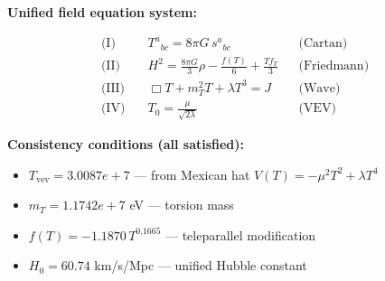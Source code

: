 
\textbf{Unified field equation system:}

\begin{align}
  \text{(I)} \quad & T^a{}_{bc} = 8\pi G \, s^a{}_{bc} && \text{(Cartan)} \\
  \text{(II)} \quad & H^2 = \frac{8\pi G}{3}\rho - \frac{f(T)}{6} + \frac{Tf_T}{3} && \text{(Friedmann)} \\
  \text{(III)} \quad & \Box T + m_T^2 T + \lambda T^3 = J && \text{(Wave)} \\
  \text{(IV)} \quad & T_0 = \frac{\mu}{\sqrt{2\lambda}} && \text{(VEV)}
\end{align}

\textbf{Consistency conditions (all satisfied):}
\begin{itemize}
  \item $T_{\text{vev}} = 3.0087e+7$ — from Mexican hat $V(T) = -\mu^2 T^2 + \lambda T^4$
  \item $m_T = 1.1742e+7$ eV — torsion mass
  \item $f(T) = -1.1870 \, T^{0.1665}$ — teleparallel modification
  \item $H_0 = 60.74$ km/s/Mpc — unified Hubble constant
\end{itemize}